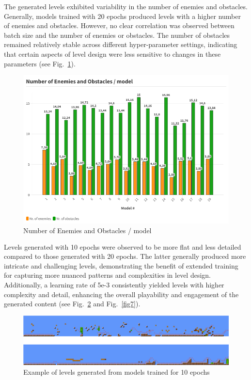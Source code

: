 \documentclass[runningheads]{llncs}
\begin{document}
The generated levels exhibited variability in the number of enemies and obstacles. Generally, models trained with 20 epochs produced levels with a higher number of enemies and obstacles. However, no clear correlation was observed between batch size and the number of enemies or obstacles. The number of obstacles remained relatively stable across different hyper-parameter settings, indicating that certain aspects of level design were less sensitive to changes in these parameters (see Fig.~\ref{fig5}).

\begin{figure}
\includegraphics[width=\textwidth]{Number of Enemies and Obstacles _ model.png}
\caption{Number of Enemies and Obstacles / model} \label{fig5}
\end{figure}

Levels generated with 10 epochs were observed to be more flat and less detailed compared to those generated with 20 epochs. The latter generally produced more intricate and challenging levels, demonstrating the benefit of extended training for capturing more nuanced patterns and complexities in level design. Additionally, a learning rate of 5e-3 consistently yielded levels with higher complexity and detail, enhancing the overall playability and engagement of the generated content (see Fig.~\ref{fig6} and Fig.~\ref{fig7}).

\begin{figure}
\includegraphics[width=\textwidth]{10_example.png}
\caption{Example of levels generated from models trained for 10 epochs} \label{fig6}
\end{figure}
\end{document}
